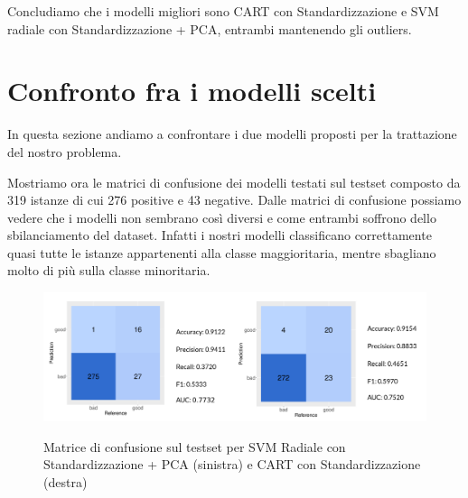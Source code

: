 \begin{table}[H]
\centering
{}
\caption{Risultati modelli scelti con Standardizzazione + PCA e rimozione outliers}
\label{tab:my-table}
\end{table}

\noindent
Concludiamo che i modelli migliori sono CART con Standardizzazione e SVM radiale con Standardizzazione + PCA, entrambi mantenendo gli outliers.

\newpage

\section{Confronto fra i modelli scelti}
In questa sezione andiamo a confrontare i due modelli proposti per la trattazione del nostro problema.

\noindent
Mostriamo ora le matrici di confusione dei modelli testati sul testset composto da 319 istanze di cui 276 positive e 43 negative.
Dalle matrici di confusione possiamo vedere che i modelli non sembrano così diversi e come entrambi soffrono dello sbilanciamento del dataset. Infatti i nostri modelli classificano correttamente quasi tutte le istanze appartenenti alla classe maggioritaria, mentre sbagliano molto di più sulla classe minoritaria.

\begin{figure}[H]
    \centering
    \includegraphics[width=\linewidth]{images/comparison/comparison2.png}
     \label{fig:confusion_matrix}
    \caption{Matrice di confusione sul testset per SVM Radiale con Standardizzazione + PCA (sinistra) e CART con Standardizzazione (destra)}
\end{figure}


